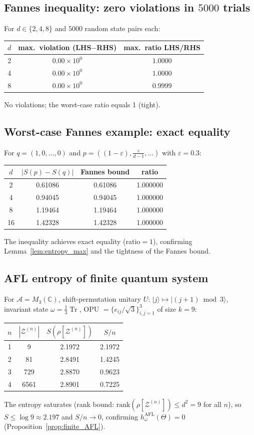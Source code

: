 \documentclass[12pt,a4paper]{article}
\DeclareMathOperator{\Tr}{Tr}
\newcommand{\A}{\mathcal{A}}
\begin{document}
\subsection{Fannes inequality: zero violations in $5000$ trials}

For $d\in\{2,4,8\}$ and $5000$ random state pairs each:
\begin{center}
\begin{tabular}{c|c|c}
$d$ & max.\ violation (LHS$-$RHS) & max.\ ratio LHS/RHS \\ \hline
2   & $0.00\times 10^{0}$  & $1.0000$ \\
4   & $0.00\times 10^{0}$  & $1.0000$ \\
8   & $0.00\times 10^{0}$  & $0.9999$
\end{tabular}
\end{center}
No violations; the worst-case ratio equals 1 (tight).

\subsection{Worst-case Fannes example: exact equality}

For $q=(1,0,\ldots,0)$ and $p=((1-\varepsilon),\tfrac{\varepsilon}{d-1},\ldots)$
with $\varepsilon=0.3$:
\begin{center}
\begin{tabular}{c|c|c|c}
$d$ & $|S(p)-S(q)|$ & Fannes bound & ratio \\ \hline
2 & 0.61086 & 0.61086 & 1.000000 \\
4 & 0.94045 & 0.94045 & 1.000000 \\
8 & 1.19464 & 1.19464 & 1.000000 \\
16& 1.42328 & 1.42328 & 1.000000
\end{tabular}
\end{center}
The inequality achieves exact equality (ratio$=1$), confirming
Lemma~\ref{lem:entropy_max} and the tightness of the Fannes bound.

\subsection{AFL entropy of finite quantum system}

For $\A=M_3(\mathbb{C})$, shift-permutation unitary $U:\,|j\rangle\mapsto|(j+1)\bmod 3\rangle$,
invariant state $\omega=\tfrac{1}{3}\Tr$, OPU $=\{e_{ij}/\sqrt{3}\}_{i,j=1}^3$ of size $k=9$:
\begin{center}
\begin{tabular}{c|c|c|c}
$n$ & $|\mathcal{Z}^{(n)}|$ & $S(\rho[\mathcal{Z}^{(n)}])$ & $S/n$ \\ \hline
1 & 9    & 2.1972 & 2.1972 \\
2 & 81   & 2.8491 & 1.4245 \\
3 & 729  & 2.8870 & 0.9623 \\
4 & 6561 & 2.8901 & 0.7225
\end{tabular}
\end{center}
The entropy saturates (rank bound: $\mathrm{rank}(\rho[\mathcal{Z}^{(n)}])\leq d^2=9$ for all $n$),
so $S\leq\log 9\approx 2.197$ and $S/n\to 0$, confirming
$h_\omega^{\mathrm{AFL}}(\Theta)=0$ (Proposition~\ref{prop:finite_AFL}).
\end{document}

